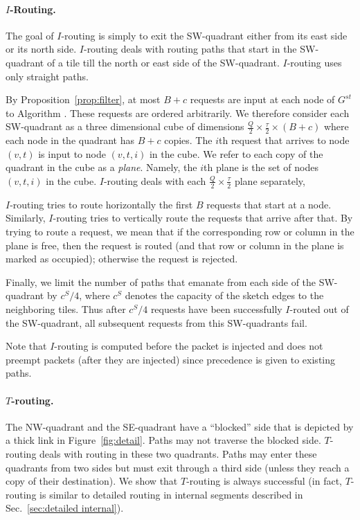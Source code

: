 \documentclass[11pt]{article}
\newcommand{\route}{\text{\sc{ipp}}}
\newenvironment{proof sketch}[1]{\noindent {\emph{Proof sketch of #1:}}}{\hfill \qed}
\newcommand{\hl}{\tau}
\newcommand{\vl}{Q}
\begin{document}
\paragraph{$I$-Routing.}
The goal of $I$-routing is simply to exit the SW-quadrant
either from its east side or its north side. $I$-routing
deals with routing paths that start in the SW-quadrant of a
tile till the north or east side of the SW-quadrant.
$I$-routing uses only straight paths.


By Proposition~\ref{prop:filter}, at most $B+c$ requests
are input at each node of $G^{st}$ to Algorithm \route.
These requests are ordered arbitrarily.  We therefore
consider each SW-quadrant as a three dimensional cube of
dimensions $\frac {\vl}{2} \times \frac {\hl}{2} \times
(B+c)$ where each node in the quadrant has $B+c$ copies.
The $i$th request that arrives to node $(v,t)$ is input to
node $(v,t,i)$ in the cube.  We refer to each copy of the
quadrant in the cube as a \emph{plane}.  Namely, the $i$th
plane is the set of nodes $(v,t,i)$ in the cube.
$I$-routing deals with each $\frac {\vl}{2} \times \frac
{\hl}{2}$ plane separately,

$I$-routing tries to route horizontally the first $B$ requests that
start at a node. Similarly, $I$-routing tries to vertically route the
 requests that arrive after that.  By trying to route a request,
we mean that if the corresponding row or column in the plane is free,
then the request is routed (and that row or column in the plane is
marked as occupied); otherwise the request is rejected.

Finally, we  limit the number of paths that emanate from each
side of the SW-quadrant by $c^S/4$, where $c^S$ denotes the capacity
of the sketch edges to the neighboring tiles. Thus after $c^S/4$ requests have been successfully
$I$-routed out of the SW-quadrant, all subsequent requests from this
SW-quadrants fail.

 Note that $I$-routing is computed
before the packet is injected and does not preempt packets (after they are injected) since
precedence is given to existing paths.

\paragraph{$T$-routing.}
The NW-quadrant and the SE-quadrant have a ``blocked'' side
that is depicted by a thick link in
Figure~\ref{fig:detail}. Paths may not traverse the blocked
side. $T$-routing deals with routing in these two
quadrants. Paths may enter these quadrants from two sides
but must exit through a third side (unless they reach a
copy of their destination).  We show that $T$-routing is
always successful (in fact, $T$-routing is similar to
detailed routing in internal segments described in
Sec.~\ref{sec:detailed internal}).
\end{document}
